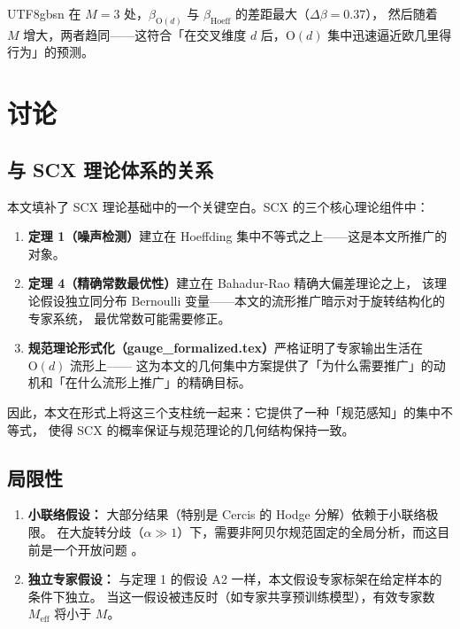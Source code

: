 \documentclass[12pt,a4paper]{article}
\theoremstyle{plain}
\theoremstyle{definition}
\theoremstyle{remark}
\newcommand{\Od}{\mathrm{O}(d)}
\begin{document}
\begin{CJK}{UTF8}{gbsn}
在 $M = 3$ 处，$\beta_{\Od}$ 与 $\beta_{\text{Hoeff}}$ 的差距最大（$\Delta\beta = 0.37$），
然后随着 $M$ 增大，两者趋同——这符合「在交叉维度 $d$ 后，$\Od$ 集中迅速逼近欧几里得行为」的预测。

\newpage

\section{讨论}

\subsection{与 SCX 理论体系的关系}

本文填补了 SCX 理论基础中的一个关键空白。SCX 的三个核心理论组件中：

\begin{enumerate}
    \item \textbf{定理 1（噪声检测）}建立在 Hoeffding 集中不等式之上——这是本文所推广的对象。
    \item \textbf{定理 4（精确常数最优性）}建立在 Bahadur-Rao 精确大偏差理论之上，
    该理论假设独立同分布 Bernoulli 变量——本文的流形推广暗示对于旋转结构化的专家系统，
    最优常数可能需要修正。
    \item \textbf{规范理论形式化（gauge\_formalized.tex）}严格证明了专家输出生活在 $\Od$ 流形上——
    这为本文的几何集中方案提供了「为什么需要推广」的动机和「在什么流形上推广」的精确目标。
\end{enumerate}

因此，本文在形式上将这三个支柱统一起来：它提供了一种「规范感知」的集中不等式，
使得 SCX 的概率保证与规范理论的几何结构保持一致。

\subsection{局限性}

\begin{enumerate}
    \item \textbf{小联络假设：} 大部分结果（特别是 Cercis 的 Hodge 分解）依赖于小联络极限。
    在大旋转分歧（$\alpha \gg 1$）下，需要非阿贝尔规范固定的全局分析，而这目前是一个开放问题 \cite{scx_gauge}。
    
    \item \textbf{独立专家假设：} 与定理 1 的假设 A2 一样，本文假设专家标架在给定样本的条件下独立。
    当这一假设被违反时（如专家共享预训练模型），有效专家数 $M_{\text{eff}}$ 将小于 $M$。


\end{enumerate}
\end{CJK}
\end{document}
